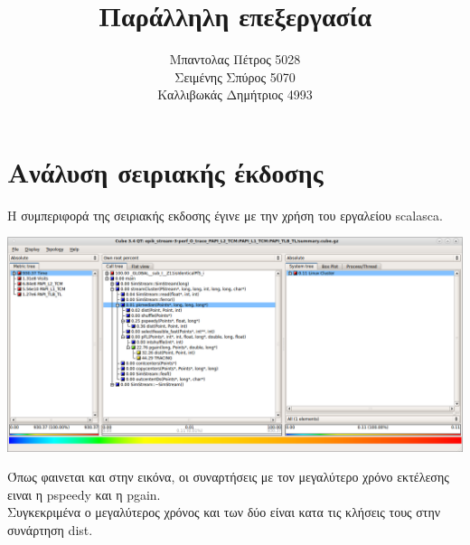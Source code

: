 \documentclass{article}
\title{Παράλληλη επεξεργασία}
\author{Μπαντολας Πέτρος 5028\\Σειμένης Σπύρος 5070\\Καλλιβωκάς Δημήτριος 4993}
\begin{document}
\maketitle
\section{Ανάλυση σειριακής έκδοσης}
Η συμπεριφορά της σειριακής εκδοσης έγινε με την χρήση του εργαλείου scalasca.
\begin{center}
\includegraphics[scale=0.5]{../scrshots/time.png}
\end{center} 
Όπως φαινεται και στην εικόνα, οι συναρτήσεις με τον μεγαλύτερο χρόνο εκτέλεσης ειναι η pspeedy και η pgain.\\
Συγκεκριμένα ο μεγαλύτερος χρόνος και των δύο είναι κατα τις κλήσεις τους στην συνάρτηση dist.
\end{document}
